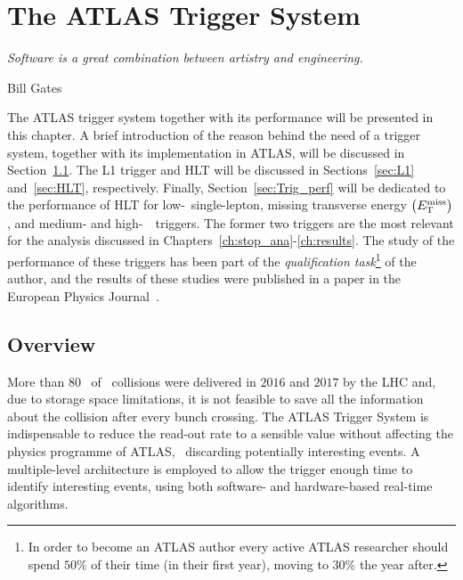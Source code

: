 \chapter{The ATLAS Trigger System}
\label{ch:trigger}
\epigraph{\emph{Software is a great combination between artistry and engineering.}}{Bill Gates}

	The \ac{ATLAS} trigger system together with its performance will be presented in this chapter. A brief introduction of the reason behind the need of a trigger system, together with its implementation in \ac{ATLAS}, will be discussed in Section~\ref{sec:Trig_intro}. The \ac{L1} trigger and \ac{HLT} will be discussed in Sections~\ref{sec:L1} and~\ref{sec:HLT}, respectively. Finally, Section~\ref{sec:Trig_perf} will be dedicated to the performance of \ac{HLT} for low-\pt\ single-lepton, missing transverse energy $\left (E_{\mathrm{T}}^{\mathrm{miss}} \right )$, and medium- and high-\pt\ \bj\ triggers. The former two triggers are the most relevant for the analysis discussed in Chapters~\ref{ch:stop_ana}-\ref{ch:results}. The study of the performance of these triggers has been part of the \textit{qualification task}\footnote{In order to become an \ac{ATLAS} author every active \ac{ATLAS} researcher should spend $50\%$ of their time (in their first year), moving to $30\%$ the year after.} of the author, and the results of these studies were published in a paper in the European Physics Journal~\cite{ATLASTrigger2015}.


	\section{Overview}
	\label{sec:Trig_intro}

		More than 80 \ifb\ of \pp\ collisions were delivered in $2016$ and $2017$ by the \ac{LHC} and, due to storage space limitations, it is not feasible to save all the information about the collision after every bunch crossing. The \ac{ATLAS} Trigger System is indispensable to reduce the read-out rate to a sensible value without affecting the physics programme of \ac{ATLAS}, \eg\ discarding potentially interesting events. A multiple-level architecture is employed to allow the trigger enough time to identify interesting events, using both software- and hardware-based real-time algorithms. 

